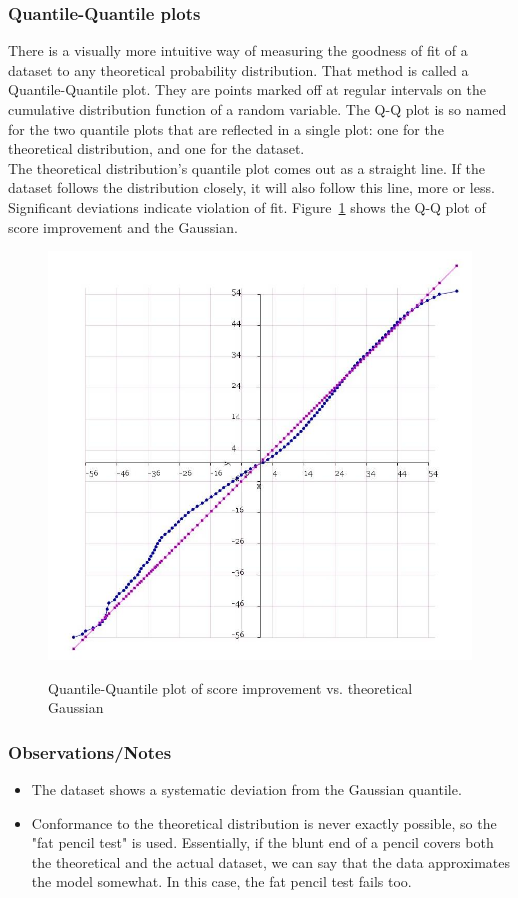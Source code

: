 \documentclass[10pt]{article}
\begin{document}
\subsubsection{Quantile-Quantile plots}
There is a visually more intuitive way of measuring the goodness of fit of a dataset to any theoretical probability distribution. That method is called a Quantile-Quantile plot. They are points marked off at regular intervals on the cumulative distribution function of a random variable. The Q-Q plot is so named for the two quantile plots that are reflected in a single plot: one for the theoretical distribution, and one for the dataset.\\
The theoretical distribution's quantile plot comes out as a straight line. If the dataset follows the distribution closely, it will also follow this line, more or less. Significant deviations indicate violation of fit. Figure~\ref{NormalProbabilityPlotImprovement} shows the Q-Q plot of score improvement and the Gaussian.
\begin{figure}
\caption{Quantile-Quantile plot of score improvement vs. theoretical Gaussian}
\label{NormalProbabilityPlotImprovement}
\begin{center}
\includegraphics[width=120mm]{ReportMedia/NormalProbabilityPlotImprovement.jpg}\\
\end{center}
\end{figure}
\subsubsection{Observations/Notes}
\begin{itemize}
\item The dataset shows a systematic deviation from the Gaussian quantile.
\item Conformance to the theoretical distribution is never exactly possible, so the "fat pencil test" is used. Essentially, if the blunt end of a pencil covers both the theoretical and the actual dataset, we can say that the data approximates the model somewhat. In this case, the fat pencil test fails too.
\end{itemize}
\end{document}
